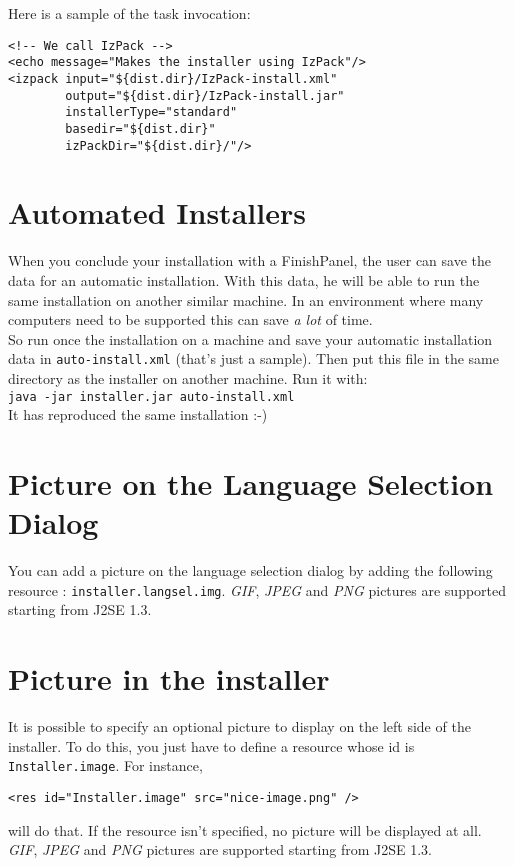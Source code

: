 Here is a sample of the task invocation:\\
\footnotesize
\begin{verbatim}
<!-- We call IzPack -->
<echo message="Makes the installer using IzPack"/>
<izpack input="${dist.dir}/IzPack-install.xml"
        output="${dist.dir}/IzPack-install.jar"
        installerType="standard"
        basedir="${dist.dir}"
        izPackDir="${dist.dir}/"/>
\end{verbatim}
\normalsize

\section{Automated Installers}

When you conclude your installation with a FinishPanel, the user can
save the data for an automatic installation. With this data, he will be
able to run the same installation on another similar machine. In an
environment where many computers need to be supported this can save
\textsl{a lot} of time.\\

So run once the installation on a machine and save your automatic installation
data in \texttt{auto-install.xml} (that's just a sample). Then put this file in
the same directory as the installer on another machine. Run it with:\\
\texttt{java -jar installer.jar auto-install.xml}\\

It has reproduced the same installation :-)\\

\section{Picture on the Language Selection Dialog}

You can add a picture on the language selection dialog by adding the following
resource : \texttt{installer.langsel.img}. \textsl{GIF}, \textsl{JPEG} and
\textsl{PNG} pictures are supported starting from J2SE 1.3.\\

\section{Picture in the installer}

It is possible to specify an optional picture to display on the left side of the
installer. To do this, you just have to define a resource whose id is
\texttt{Installer.image}. For instance,
\begin{verbatim}
<res id="Installer.image" src="nice-image.png" />
\end{verbatim}
will do that. If the resource isn't specified, no picture will be displayed at
all. \textsl{GIF}, \textsl{JPEG} and
\textsl{PNG} pictures are supported starting from J2SE 1.3.\\

